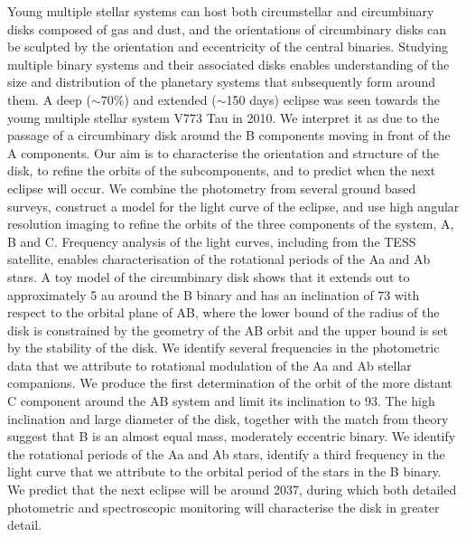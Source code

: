 \documentclass{aa}
\begin{document}
  \abstract
   {Young multiple stellar systems can host both circumstellar and circumbinary disks composed of gas and dust, and the orientations of circumbinary disks can be sculpted by the orientation and eccentricity of the central binaries.
   Studying multiple binary systems and their associated disks enables understanding of the size and distribution of the planetary systems that subsequently form around them.}
   {A deep ($\sim 70$\%) and extended ($\sim$150 days) eclipse was seen towards the young multiple stellar system V773 Tau in 2010.
   We interpret it as due to the passage of a circumbinary disk around the B components moving in front of the A components.
 Our aim is to characterise the orientation and structure of the disk, to refine the orbits of the subcomponents, and to predict when the next eclipse will occur.}
   {We combine the photometry from several ground based surveys, construct a model for the light curve of the eclipse, and use high angular resolution imaging to refine the orbits of the three components of the system, A, B and C.
   Frequency analysis of the light curves, including from the TESS satellite, enables characterisation of the rotational periods of the Aa and Ab stars.}
   {A toy model of the circumbinary disk shows that it extends out to approximately 5 au around the B binary and has an inclination of 73\degr{} with respect to the orbital plane of AB, where the lower bound of the radius of the disk is constrained by the geometry of the AB orbit and the upper bound is set by the stability of the disk.
   We identify several frequencies in the photometric data that we attribute to rotational modulation of the Aa and Ab stellar companions.
   We produce the first determination of the orbit of the more distant C component around the AB system and limit its inclination to 93\degr{}.
}
   {The high inclination and large diameter of the disk, together with the match from theory suggest that B is an almost equal mass, moderately eccentric binary.
   We identify the rotational periods of the Aa and Ab stars, identify a third frequency in the light curve that we attribute to the orbital period of the stars in the B binary.
   We predict that the next eclipse will be around 2037, during which both detailed photometric and spectroscopic monitoring will characterise the disk in greater detail.}
\end{document}
